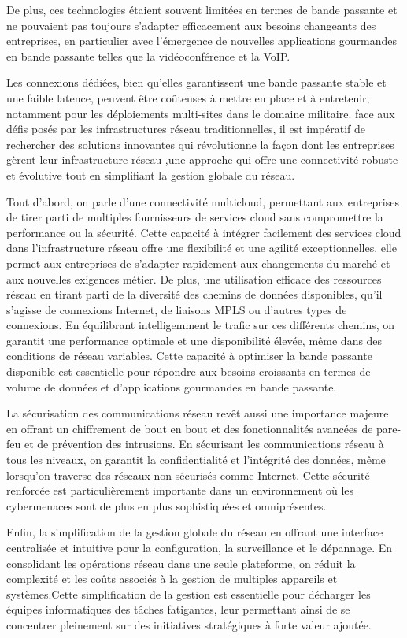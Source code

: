 De plus, ces technologies étaient souvent limitées en termes de bande passante et ne pouvaient pas toujours s'adapter efficacement aux besoins changeants des entreprises, en particulier avec l'émergence de nouvelles applications gourmandes en bande passante telles que la vidéoconférence et la VoIP.

Les connexions dédiées, bien qu'elles garantissent une bande passante stable et une faible latence, peuvent être coûteuses à mettre en place et à entretenir, notamment pour les déploiements multi-sites dans le domaine militaire. 
face aux défis posés par les infrastructures réseau traditionnelles, il est impératif de rechercher des solutions innovantes qui révolutionne la façon dont les entreprises gèrent leur infrastructure réseau ,une approche qui offre une connectivité robuste et évolutive tout en simplifiant la gestion globale du réseau.

Tout d'abord, on parle d’une connectivité multicloud, permettant aux entreprises de tirer parti de multiples fournisseurs de services cloud sans compromettre la performance ou la sécurité. Cette capacité à intégrer facilement des services cloud dans l'infrastructure réseau offre une flexibilité et une agilité exceptionnelles. elle permet aux entreprises de s'adapter rapidement aux changements du marché et aux nouvelles exigences métier.
De plus, une utilisation efficace des ressources réseau en tirant parti de la diversité des chemins de données disponibles, qu'il s'agisse de connexions Internet, de liaisons MPLS ou d'autres types de connexions. En équilibrant intelligemment le trafic sur ces différents chemins, on garantit une performance optimale et une disponibilité élevée, même dans des conditions de réseau variables. Cette capacité à optimiser la bande passante disponible est essentielle pour répondre aux besoins croissants en termes de volume de données et d'applications gourmandes en bande passante.

La sécurisation des communications réseau revêt aussi une importance majeure en offrant un chiffrement de bout en bout et des fonctionnalités avancées de pare-feu et de prévention des intrusions. En sécurisant les communications réseau à tous les niveaux, on garantit la confidentialité et l'intégrité des données, même lorsqu’on traverse des réseaux non sécurisés comme Internet. Cette sécurité renforcée est particulièrement importante dans un environnement où les cybermenaces sont de plus en plus sophistiquées et omniprésentes.

Enfin, la simplification de la gestion globale du réseau en offrant une interface centralisée et intuitive pour la configuration, la surveillance et le dépannage. En consolidant les opérations réseau dans une seule plateforme, on  réduit la complexité et les coûts associés à la gestion de multiples appareils et systèmes.Cette simplification de la gestion est essentielle pour décharger les équipes informatiques des tâches fatigantes, leur permettant ainsi de se concentrer pleinement sur des initiatives stratégiques à forte valeur ajoutée.
